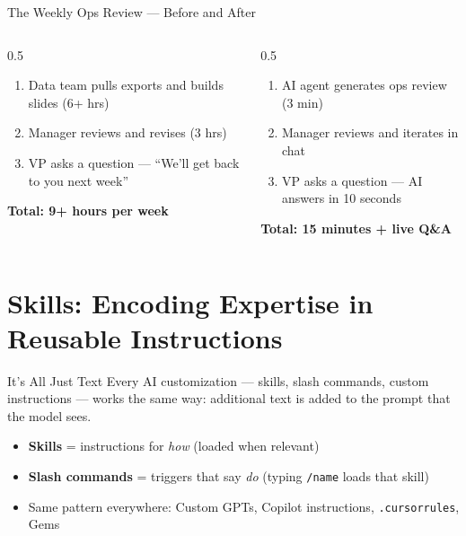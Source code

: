 \documentclass[aspectratio=169]{beamer}
\begin{document}
\begin{frame}{The Weekly Ops Review --- Before and After}
\begin{columns}[T]
\begin{column}{0.5\textwidth}
\begin{shadedbox}[title=\textbf{Before: The Dashboard Era}]
\begin{enumerate}\small
  \item Data team pulls exports and builds slides (6+ hrs)
  \item Manager reviews and revises (3 hrs)
  \item VP asks a question --- ``We'll get back to you next week''
\end{enumerate}
\vspace{0.2cm}
\centering\small\textbf{Total: 9+ hours per week}
\end{shadedbox}
\end{column}
\begin{column}{0.5\textwidth}
\begin{shadedbox}[title=\textbf{After: Natural Language AI}]
\begin{enumerate}\small
  \item AI agent generates ops review (3 min)
  \item Manager reviews and iterates in chat
  \item VP asks a question --- \alert{AI answers in 10 seconds}
\end{enumerate}
\vspace{0.2cm}
\centering\small\textbf{Total: 15 minutes + live Q\&A}
\end{shadedbox}
\end{column}
\end{columns}
\end{frame}

\section{Skills: Encoding Expertise in Reusable Instructions}

\begin{frame}{It's All Just Text}
Every AI customization --- skills, slash commands, custom instructions --- works the same way: \alert{additional text is added to the prompt} that the model sees.
\vspace{0.3cm}
\begin{itemize}
  \item \textbf{Skills} = instructions for \textit{how} (loaded when relevant)
  \item \textbf{Slash commands} = triggers that say \textit{do} (typing \texttt{/name} loads that skill)
  \item Same pattern everywhere: Custom GPTs, Copilot instructions, \texttt{.cursorrules}, Gems
\end{itemize}
\end{frame}
\end{document}
